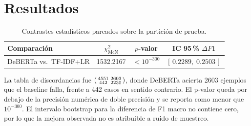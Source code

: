 \section{Resultados}

\begin{table}[h]
  \centering
  \begin{tabular}{lccc}
    \toprule
    Comparación & $\chi^2_{\text{McN}}$ & $p$-valor & IC 95\,\% $\Delta F1$ \\
    \midrule
    DeBERTa vs.\ TF-IDF+LR & 1532.2167 & $<10^{-300}$ & $[\,0.2289,\;0.2503\,]$ \\
    \bottomrule
  \end{tabular}
  \caption{Contrastes estadísticos pareados sobre la partición de prueba.}
  \label{tab:tests}
\end{table}

La tabla de discordancias fue
$\begin{psmallmatrix}4551 & 2603 \\ 442 & 2230\end{psmallmatrix}$,
donde DeBERTa acierta 2603 ejemplos que el baseline falla, frente a
442 casos en sentido contrario. El p-valor queda por debajo de la
precisión numérica de doble precisión y se reporta como menor que
$10^{-300}$. El intervalo bootstrap para la diferencia de F1 macro no
contiene cero, por lo que la mejora observada no es atribuible a ruido
de muestreo.
